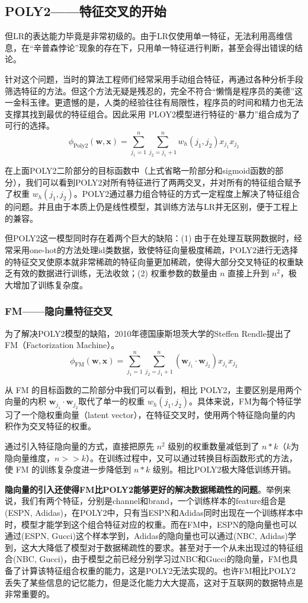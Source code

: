 \documentclass[12pt]{article}
\begin{document}
\subsection{POLY2——特征交叉的开始}
但LR的表达能力毕竟是非常初级的。由于LR仅使用单一特征，无法利用高维信息，在“辛普森悖论”现象的存在下，只用单一特征进行判断，甚至会得出错误的结论。

针对这个问题，当时的算法工程师们经常采用手动组合特征，再通过各种分析手段筛选特征的方法。但这个方法无疑是残忍的，完全不符合“懒惰是程序员的美德”这一金科玉律。更遗憾的是，人类的经验往往有局限性，程序员的时间和精力也无法支撑其找到最优的特征组合。因此采用 PLOY2模型进行特征的“暴力”组合成为了可行的选择。
$$
\phi_{\text{Poly2}}(\mathbf{w}, \mathbf{x}) = \sum_{j_1=1}^n\sum_{j_2 = j_1 + 1}^n w_h(j_1, j_2)x_{j_1}x_{j_2}
$$

在上面POLY2二阶部分的目标函数中（上式省略一阶部分和sigmoid函数的部分），我们可以看到POLY2对所有特征进行了两两交叉，并对所有的特征组合赋予了权重 $w_h(j_1, j_2)$。POLY2通过暴力组合特征的方式一定程度上解决了特征组合的问题。并且由于本质上仍是线性模型，其训练方法与LR并无区别，便于工程上的兼容。

但POLY2这一模型同时存在着两个巨大的缺陷：(1) 由于在处理互联网数据时，经常采用one-hot的方法处理id类数据，致使特征向量极度稀疏，POLY2进行无选择的特征交叉使原本就非常稀疏的特征向量更加稀疏，使得大部分交叉特征的权重缺乏有效的数据进行训练，无法收敛；(2) 权重参数的数量由 $n$ 直接上升到 $n^2$，极大增加了训练复杂度。

\subsubsection{FM——隐向量特征交叉}
为了解决POLY2模型的缺陷，2010年德国康斯坦茨大学的Steffen Rendle提出了FM（Factorization Machine）。
$$
\phi_{\text{FM}}(\mathbf{w}, \mathbf{x}) = \sum_{j_1=1}^n\sum_{j_2 = j_1 + 1}^n (\mathbf{w}_{j_1} \cdot \mathbf{w}_{j_2})x_{j_1}x_{j_2}
$$

从 FM 的目标函数的二阶部分中我们可以看到，相比 POLY2，主要区别是用两个向量的内积 $\mathbf{w}_{j_1} \cdot \mathbf{w}_{j_2}$取代了单一的权重 $w_h(j_1, j_2)$。具体来说，FM为每个特征学习了一个隐权重向量（latent vector），在特征交叉时，使用两个特征隐向量的内积作为交叉特征的权重。

通过引入特征隐向量的方式，直接把原先 $n^2$ 级别的权重数量减低到了 $n*k$（$k$为隐向量维度，$n >> k$）。在训练过程中，又可以通过转换目标函数形式的方法，使 FM 的训练复杂度进一步降低到 $n*k$ 级别。相比POLY2极大降低训练开销。

\textbf{隐向量的引入还使得FM比POLY2能够更好的解决数据稀疏性的问题}。举例来说，我们有两个特征，分别是channel和brand，一个训练样本的feature组合是(ESPN, Adidas)，在POLY2中，只有当ESPN和Adidas同时出现在一个训练样本中时，模型才能学到这个组合特征对应的权重。而在FM中，ESPN的隐向量也可以通过(ESPN, Gucci)这个样本学到，Adidas的隐向量也可以通过(NBC, Adidas)学到，这大大降低了模型对于数据稀疏性的要求。甚至对于一个从未出现过的特征组合(NBC, Gucci)，由于模型之前已经分别学习过NBC和Gucci的隐向量，FM也具备了计算该特征组合权重的能力，这是POLY2无法实现的。也许FM相比POLY2丢失了某些信息的记忆能力，但是泛化能力大大提高，这对于互联网的数据特点是非常重要的。
\end{document}
